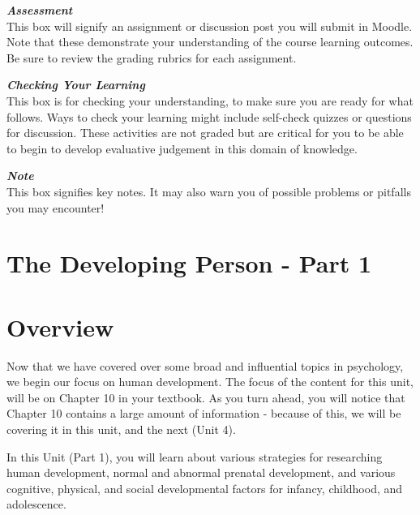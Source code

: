 \documentclass[
]{book}
\begin{document}
\begin{assessment}
\textbf{\emph{Assessment}}\\
This box will signify an assignment or discussion post you will submit in Moodle. Note that these demonstrate your understanding of the course learning outcomes. Be sure to review the grading rubrics for each assignment.
\end{assessment}

\begin{progress}
\textbf{\emph{Checking Your Learning}}\\
This box is for checking your understanding, to make sure you are ready for what follows. Ways to check your learning might include self-check quizzes or questions for discussion. These activities are not graded but are critical for you to be able to begin to develop evaluative judgement in this domain of knowledge.
\end{progress}

\begin{caution}
\textbf{\emph{Note}}\\
This box signifies key notes. It may also warn you of possible problems or pitfalls you may encounter!
\end{caution}

\hypertarget{the-developing-person---part-1}{%
\section{The Developing Person - Part 1}\label{the-developing-person---part-1}}

\hypertarget{overview}{%
\section*{Overview}\label{overview}}

Now that we have covered over some broad and influential topics in psychology, we begin our focus on human development. The focus of the content for this unit, will be on Chapter 10 in your textbook. As you turn ahead, you will notice that Chapter 10 contains a large amount of information - because of this, we will be covering it in this unit, and the next (Unit 4).

In this Unit (Part 1), you will learn about various strategies for researching human development, normal and abnormal prenatal development, and various cognitive, physical, and social developmental factors for infancy, childhood, and adolescence.
\end{document}
